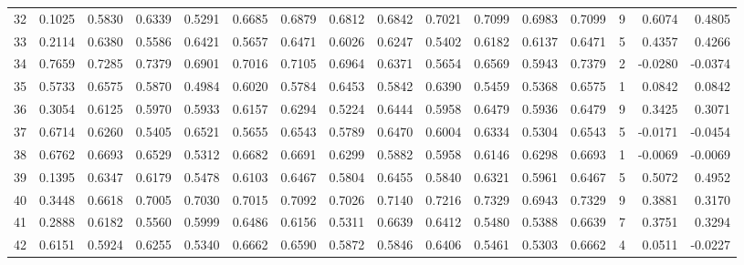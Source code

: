 \begin{tabular}{lrrrrrrrrrrrrrrr}
32  &      0.1025 &  0.5830 &  0.6339 &  0.5291 &  0.6685 &  0.6879 &  0.6812 &  0.6842 &  0.7021 &  0.7099 &   0.6983 &     0.7099 &      9 &                    0.6074 &                     0.4805 \\
33  &      0.2114 &  0.6380 &  0.5586 &  0.6421 &  0.5657 &  0.6471 &  0.6026 &  0.6247 &  0.5402 &  0.6182 &   0.6137 &     0.6471 &      5 &                    0.4357 &                     0.4266 \\
34  &      0.7659 &  0.7285 &  0.7379 &  0.6901 &  0.7016 &  0.7105 &  0.6964 &  0.6371 &  0.5654 &  0.6569 &   0.5943 &     0.7379 &      2 &                   -0.0280 &                    -0.0374 \\
35  &      0.5733 &  0.6575 &  0.5870 &  0.4984 &  0.6020 &  0.5784 &  0.6453 &  0.5842 &  0.6390 &  0.5459 &   0.5368 &     0.6575 &      1 &                    0.0842 &                     0.0842 \\
36  &      0.3054 &  0.6125 &  0.5970 &  0.5933 &  0.6157 &  0.6294 &  0.5224 &  0.6444 &  0.5958 &  0.6479 &   0.5936 &     0.6479 &      9 &                    0.3425 &                     0.3071 \\
37  &      0.6714 &  0.6260 &  0.5405 &  0.6521 &  0.5655 &  0.6543 &  0.5789 &  0.6470 &  0.6004 &  0.6334 &   0.5304 &     0.6543 &      5 &                   -0.0171 &                    -0.0454 \\
38  &      0.6762 &  0.6693 &  0.6529 &  0.5312 &  0.6682 &  0.6691 &  0.6299 &  0.5882 &  0.5958 &  0.6146 &   0.6298 &     0.6693 &      1 &                   -0.0069 &                    -0.0069 \\
39  &      0.1395 &  0.6347 &  0.6179 &  0.5478 &  0.6103 &  0.6467 &  0.5804 &  0.6455 &  0.5840 &  0.6321 &   0.5961 &     0.6467 &      5 &                    0.5072 &                     0.4952 \\
40  &      0.3448 &  0.6618 &  0.7005 &  0.7030 &  0.7015 &  0.7092 &  0.7026 &  0.7140 &  0.7216 &  0.7329 &   0.6943 &     0.7329 &      9 &                    0.3881 &                     0.3170 \\
41  &      0.2888 &  0.6182 &  0.5560 &  0.5999 &  0.6486 &  0.6156 &  0.5311 &  0.6639 &  0.6412 &  0.5480 &   0.5388 &     0.6639 &      7 &                    0.3751 &                     0.3294 \\
42  &      0.6151 &  0.5924 &  0.6255 &  0.5340 &  0.6662 &  0.6590 &  0.5872 &  0.5846 &  0.6406 &  0.5461 &   0.5303 &     0.6662 &      4 &                    0.0511 &                    -0.0227 \\

\end{tabular}
